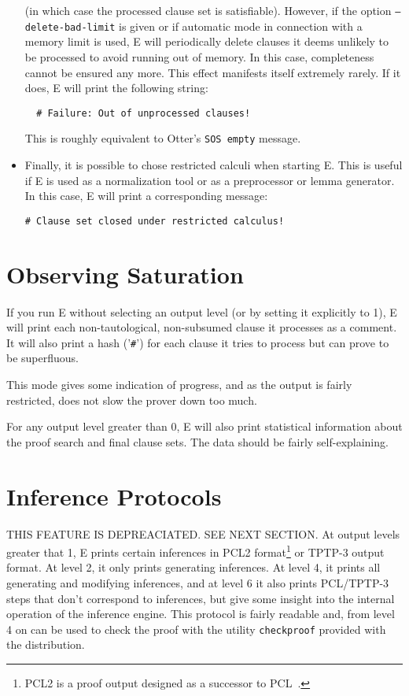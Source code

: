 \documentclass{report}
\begin{document}
\begin{itemize}
  (in which case the processed clause set is satisfiable). However, if
  the option \texttt{--delete-bad-limit} is given or if automatic mode
  in connection with a memory limit is used, E will periodically
  delete clauses it deems unlikely to be processed to avoid running
  out of memory. In this case, completeness cannot be ensured any
  more. This effect manifests itself extremely rarely. If it does, E
  will print the following string:
\begin{verbatim}
  # Failure: Out of unprocessed clauses!
\end{verbatim}
  This is roughly equivalent to Otter's \texttt{SOS empty} message.
\item Finally, it is possible to chose restricted calculi when
  starting E. This is useful if E is used as a normalization tool or
  as a preprocessor or lemma generator. In this case, E will print a
  corresponding message:
\begin{verbatim}
# Clause set closed under restricted calculus!
\end{verbatim}
\end{itemize}


\section{Observing Saturation}
\label{sec:output:normal}

If you run E without selecting an output level (or by setting it
explicitly to 1), E will print each non-tautological, non-subsumed
clause it processes as a comment. It will also print a hash
('\verb+#+') for each clause it tries to process but can prove to be
superfluous.

This mode gives some indication of progress, and as the output is
fairly restricted, does not slow the prover down too much.

For any output level greater than 0, E will also print statistical
information about the proof search and final clause sets. The data
should be fairly self-explaining.


\section{Inference Protocols}
\label{sec:output:lots}

THIS FEATURE IS DEPREACIATED. SEE NEXT SECTION. At output levels
greater that 1, E prints certain inferences in PCL2
format\footnote{PCL2 is a proof output designed as a successor to
  PCL~\cite{DS94a,DS94b,DS96a}.} or TPTP-3 output
format.  At level 2, it only prints generating
inferences. At level 4, it prints all generating and modifying
inferences, and at level 6 it also prints PCL/TPTP-3 steps that don't
correspond to inferences, but give some insight into the internal
operation of the inference engine.  This protocol is fairly readable
and, from level 4 on can be used to check the proof with the utility
\texttt{checkproof} provided with the distribution.
\end{document}
